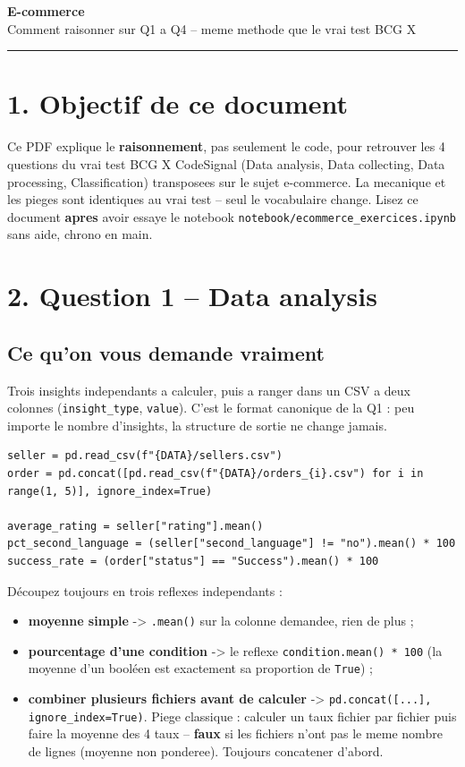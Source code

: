 \documentclass[11pt]{article}
\newcommand{\exhead}[1]{\subsection{#1}}
\begin{document}
\begin{center}
  {\huge\bfseries\color{bcg} E-commerce}\\[4pt]
  {\large Comment raisonner sur Q1 a Q4 -- meme methode que le vrai test BCG X}
\end{center}
\vspace{4pt}\hrule\vspace{10pt}

\section{1. Objectif de ce document}
Ce PDF explique le \textbf{raisonnement}, pas seulement le code, pour
retrouver les 4 questions du vrai test BCG X CodeSignal (Data analysis,
Data collecting, Data processing, Classification) transposees sur le sujet e-commerce. La mecanique
et les pieges sont identiques au vrai test -- seul le vocabulaire change.
Lisez ce document \textbf{apres} avoir essaye le notebook
\texttt{notebook/ecommerce\_exercices.ipynb} sans
aide, chrono en main.

\section{2. Question 1 -- Data analysis}

\exhead{Ce qu'on vous demande vraiment}
Trois \og insights \fg{} independants a calculer, puis a ranger dans un
CSV a deux colonnes (\texttt{insight\_type}, \texttt{value}). C'est le
format canonique de la Q1 : peu importe le nombre d'insights, la structure
de sortie ne change jamais.

\begin{lstlisting}
seller = pd.read_csv(f"{DATA}/sellers.csv")
order = pd.concat([pd.read_csv(f"{DATA}/orders_{i}.csv") for i in range(1, 5)], ignore_index=True)

average_rating = seller["rating"].mean()
pct_second_language = (seller["second_language"] != "no").mean() * 100
success_rate = (order["status"] == "Success").mean() * 100
\end{lstlisting}

\begin{explik}
D\'ecoupez toujours en trois reflexes independants :
\begin{itemize}[nosep]
  \item \textbf{moyenne simple} -> \texttt{.mean()} sur la colonne
        demandee, rien de plus ;
  \item \textbf{pourcentage d'une condition} -> le reflexe
        \texttt{condition.mean() * 100} (la moyenne d'un bool\'een est
        exactement sa proportion de \texttt{True}) ;
  \item \textbf{combiner plusieurs fichiers avant de calculer} ->
        \texttt{pd.concat([...], ignore\_index=True)}. Piege classique :
        calculer un taux fichier par fichier puis faire la moyenne des 4
        taux -- \textbf{faux} si les fichiers n'ont pas le meme nombre de
        lignes (moyenne non ponderee). Toujours concatener d'abord.
\end{itemize}
\end{explik}
\end{document}
